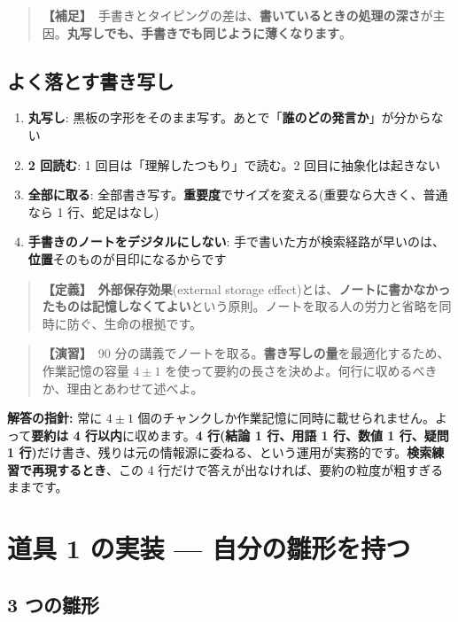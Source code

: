 \documentclass{article}
\begin{document}
\begin{quote}
\textbf{【補足】}\ 手書きとタイピングの差は、\textbf{書いているときの処理の深さ}が主因。\textbf{丸写しでも、手書きでも同じように薄くなります}。
\end{quote}

\subsection{よく落とす書き写し}

\begin{enumerate}
\item \textbf{丸写し}: 黒板の字形をそのまま写す。あとで「\textbf{誰のどの発言か}」が分からない
\item \textbf{2 回読む}: 1 回目は「理解したつもり」で読む。2 回目に抽象化は起きない
\item \textbf{全部に取る}: 全部書き写す。\textbf{重要度}でサイズを変える(重要なら大きく、普通なら 1 行、蛇足はなし)
\item \textbf{手書きのノートをデジタルにしない}: 手で書いた方が検索経路が早いのは、\textbf{位置}そのものが目印になるからです
\end{enumerate}

\begin{quote}
\textbf{【定義】}\ \textbf{外部保存効果}(external storage effect)とは、\textbf{ノートに書かなかったものは記憶しなくてよい}という原則。ノートを取る人の労力と省略を同時に防ぐ、生命の根拠です。
\end{quote}

\begin{quote}
\textbf{【演習】}\ 90 分の講義でノートを取る。\textbf{書き写しの量}を最適化するため、作業記憶の容量 \(4 \pm 1\) を使って要約の長さを決めよ。何行に収めるべきか、理由とあわせて述べよ。
\end{quote}

\textbf{解答の指針:} 常に \(4 \pm 1\) 個のチャンクしか作業記憶に同時に載せられません。よって\textbf{要約は 4 行以内}に収めます。\textbf{4 行(結論 1 行、用語 1 行、数値 1 行、疑問 1 行)}だけ書き、残りは元の情報源に委ねる、という運用が実務的です。\textbf{検索練習で再現するとき}、この 4 行だけで答えが出なければ、要約の粒度が粗すぎるままです。

\section{道具 1 の実装 — 自分の雛形を持つ}

\subsection{3 つの雛形}
\end{document}
